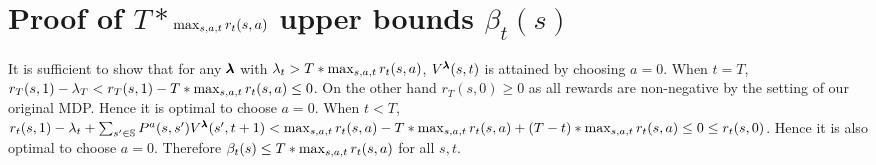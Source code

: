 \section{Proof of  $T*$\lowercase{$\max_{s,a,t}r_t(s,a)$} upper bounds \lowercase{$\beta_t(s)$}}\label{ap:upbd}
It is sufficient to show that for any $\pmb{\lambda}$ with $\lambda_t > T*\max_{s,a,t}r_t(s,a)$, $V^{\pmb{\lambda}}(s,t)$ is attained by choosing $a=0$. When $t=T$, $r_T(s,1)-\lambda_T<r_T(s,1)-T*\max_{s,a,t}r_t(s,a)\leq 0$. On the other hand $r_T(s,0)\geq 0$ as all rewards are non-negative by the setting of our original MDP. Hence it is optimal to choose $a=0$. When $t<T$, $r_t(s,1)-\lambda_t+\sum_{s'\in \mathbb{S}}P^a(s,s')V^{\pmb{\lambda}}(s',t+1)< \max_{s,a,t}r_t(s,a)-T*\max_{s,a,t}r_t(s,a)+(T-t)*\max_{s,a,t}r_t(s,a) \leq 0 \leq r_t(s,0)$. Hence it is also optimal to choose $a=0$. Therefore $\beta_t(s)\leq T*\max_{s,a,t}r_t(s,a)$ for all $s,t$.

